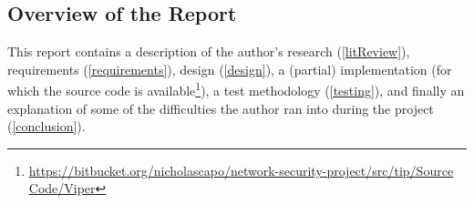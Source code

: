 \subsection{Overview of the Report}

This report contains a description of the author's research (\ref{litReview}), requirements (\ref{requirements}), design (\ref{design}), a (partial) implementation (for which the source code is available\footnote{\url{https://bitbucket.org/nicholascapo/network-security-project/src/tip/Source Code/Viper}}), a test methodology (\ref{testing}), and finally an explanation of some of the difficulties the author ran into during the project (\ref{conclusion}).
